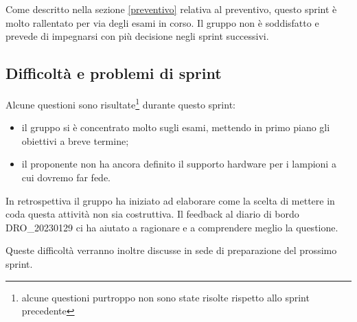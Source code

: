 Come descritto nella sezione \ref{preventivo} relativa al preventivo, questo sprint è molto rallentato per via degli esami in corso. Il gruppo non è soddisfatto e prevede di impegnarsi con più decisione negli sprint successivi.

\subsection{Difficoltà e problemi di sprint}

Alcune questioni sono risultate\footnote{alcune questioni purtroppo non sono state risolte rispetto allo sprint precedente} durante questo sprint:

\begin{itemize}
    \item il gruppo si è concentrato molto sugli esami, mettendo in primo piano gli obiettivi a breve termine;
    \item il proponente non ha ancora definito il supporto hardware per i lampioni a cui dovremo far fede.
\end{itemize}

In retrospettiva il gruppo ha iniziato ad elaborare come la scelta di mettere in coda questa attività non sia costruttiva.
Il feedback al diario di bordo DRO\_20230129 ci ha aiutato a ragionare e a comprendere meglio la questione.

Queste difficoltà verranno inoltre discusse in sede di preparazione del prossimo sprint.
